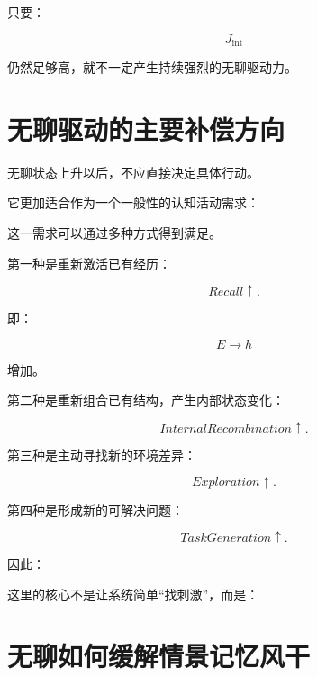 只要：

\[
J_{\mathrm{int}}
\]

仍然足够高，就不一定产生持续强烈的无聊驱动力。

\section{无聊驱动的主要补偿方向}

无聊状态上升以后，不应直接决定具体行动。

它更加适合作为一个一般性的认知活动需求：

\begin{statementbox}
\centering
{}
\end{statementbox}

这一需求可以通过多种方式得到满足。

第一种是重新激活已有经历：

\[
Recall\uparrow.
\]

即：

\[
E\rightarrow h
\]

增加。

第二种是重新组合已有结构，产生内部状态变化：

\[
InternalRecombination\uparrow.
\]

第三种是主动寻找新的环境差异：

\[
Exploration\uparrow.
\]

第四种是形成新的可解决问题：

\[
TaskGeneration\uparrow.
\]

因此：

\begin{statementbox}
\centering
{}
\end{statementbox}

这里的核心不是让系统简单“找刺激”，而是：

\begin{statementbox}
\centering
{}
\end{statementbox}

\section{无聊如何缓解情景记忆风干}


